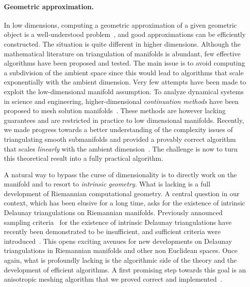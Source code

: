 \paragraph{Geometric approximation.}
In low dimensions, computing a geometric approximation of a given geometric
object is a well-understood problem~\cite{geometrica-ecg-book,dey-csr-2007}, and good approximations can be
efficiently constructed.
The situation is quite different in higher dimensions.  Although the
mathematical literature on triangulation of manifolds is abundant, few
effective algorithms have been proposed and tested.  The main issue is
to avoid computing a subdivision of the ambient space since this would lead to algorithms that scale exponentially with the ambient dimension. Very few attempts have been made to exploit the  low-dimensional manifold assumption.
To analyze {dynamical systems} in science and engineering, higher-dimensional {\em continuation methods} have been proposed to mesh solution manifolds~\cite{mh-mpc-2002}. These methods are however lacking guarantees and are restricted in practice to low dimensional manifolds. 
Recently, we made progress towards a better understanding of the complexity issues of triangulating smooth submanifolds and provided a provably correct algorithm that scales {\em linearly} with the ambient dimension~\cite{boissonnat2010meshing}. 
The challenge is now to turn this theoretical result into a fully practical algorithm.

A natural way to bypass the curse of dimensionality is to directly
work on the manifold and to resort to {\em intrinsic geometry}. What
is lacking is a full development of Riemannian computational
geometry. A central question in our context, which has been elusive
for a long time, asks for the existence of intrinsic Delaunay triangulations on
Riemannian manifolds. Previously announced sampling
criteria~\cite{leibon2000} for the existence of intrinsic Delaunay
triangulations have recently been demonstrated to be insufficient, and
sufficient criteria were introduced~\cite{boissonnat2012stab}. This opens exciting avenues for new developments on Delaunay triangulations in Riemannian manifolds and other non Euclidean spaces. Once again, what is profoundly lacking is the algorithmic side of the theory and the development of efficient algorithms.  A first promising step towards this goal is an anisotropic meshing algorithm that we proved correct and implemented~\cite{bwy-luam-08}.


